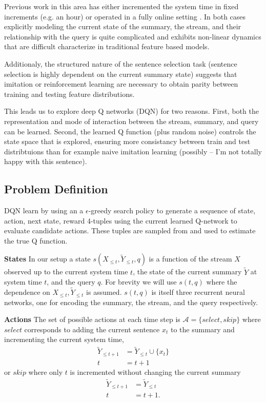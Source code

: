\documentclass[12pt]{article}
\begin{document}
  Previous work in this area has either incremented the system time in fixed
  increments (e.g. an hour) 
  \cite{mccreadie2014incremental,kedzie2015predicting} or operated in
  a fully online setting \cite{guo2013updating,kedzie2016real}. In both cases 
  explicitly 
  modeling the current state of the summary, the stream, and their relationship
  with the query is quite complicated and exhibits non-linear dynamics that 
  are difficult characterize in traditional feature based models.

  Additionaly, the structured nature of the sentence selection task 
  (sentence selection is
  highly dependent on the current summary state) suggests that imitation 
  or reinforcement learning are necessary to obtain parity between training
  and testing feature distributions. 

  This leads us to explore deep Q networks (DQN) for two reasons. 
  First, both the 
  representation and mode of interaction between the stream, summary, and 
  query can be learned. 
  Second, the learned Q function (plus random noise) controls the state 
  space that is explored, ensuring more consistancy between train and test 
  distribtuions than for example naive imitation learning 
  (possibly -- I'm not totally happy with this sentence).

  \subsection{Problem Definition}
   
    DQN learn by using an a $\epsilon$-greedy search policy to generate a 
    sequence of state, action, next state, reward 4-tuples using the current
    learned Q-network to evaluate candidate actions. These tuples are sampled
    from and used to estimate the true Q function.

    \textbf{States} 
    In our setup a state $s(X_{\le t},\tilde{Y}_{\le t}, q)$ is a function
    of the stream $X$ observed up to the current system time $t$, the state
    of the current summary $\tilde{Y}$ at system time $t$, and the query $q$.
    For brevity we will use $s(t,q)$ where the dependence on 
    $X_{\le t},\tilde{Y}_{\le t}$ is assumed.
    $s(t,q)$ is itself three recurrent neural networks, one for encoding 
    the summary, the stream, and the query respectively.

    \textbf{Actions} 
    The set of possible actions at each time step is 
    $\mathcal{A} = \{select, skip\}$ where $select$ corresponds to adding the 
    current sentence $x_t$ to the summary and incrementing the current system
    time, 
    \begin{align*}
        \tilde{Y}_{\le t + 1} &= \tilde{Y}_{\le t} \cup \{ x_t \} \\
        t &= t + 1    
    \end{align*}
    or $skip$ where only $t$ is incremented without changing the current 
    summary
    \begin{align*}
        \tilde{Y}_{\le t + 1} &= \tilde{Y}_{\le t}  \\
        t &= t + 1.
    \end{align*}
\end{document}
